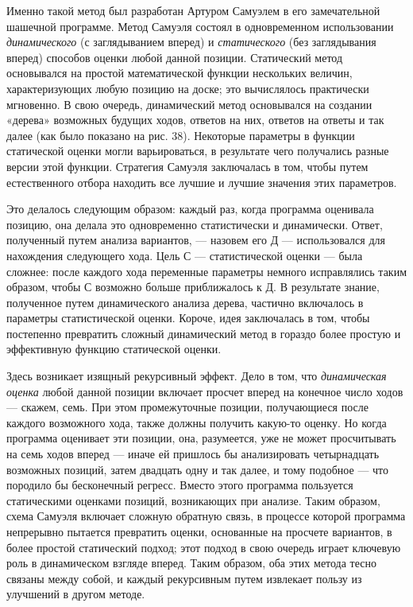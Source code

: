 Именно такой метод был разработан Артуром Самуэлем в его замечательной шашечной программе. Метод Самуэля состоял в одновременном использовании \emph{динамического} (с заглядыванием вперед) и \emph{статического} (без заглядывания вперед) способов оценки любой данной позиции. Статический метод основывался на простой математической функции нескольких величин, характеризующих любую позицию на доске; это вычислялось практически мгновенно. В свою очередь, динамический метод основывался на создании «дерева» возможных будущих ходов, ответов на них, ответов на ответы и так далее (как было показано на рис. 38). Некоторые параметры в функции статической оценки могли варьироваться, в результате чего получались разные версии этой функции. Стратегия Самуэля заключалась в том, чтобы путем естественного отбора находить все лучшие и лучшие значения этих параметров.

Это делалось следующим образом: каждый раз, когда программа оценивала позицию, она делала это одновременно статистически и динамически. Ответ, полученный путем анализа вариантов, --- назовем его Д --- использовался для нахождения следующего хода. Цель С --- статистической оценки --- была сложнее: после каждого хода переменные параметры немного исправлялись таким образом, чтобы С возможно больше приближалось к Д. В результате знание, полученное путем динамического анализа дерева, частично включалось в параметры статистической оценки. Короче, идея заключалась в том, чтобы постепенно превратить сложный динамический метод в гораздо более простую и эффективную функцию статической оценки.

Здесь возникает изящный рекурсивный эффект. Дело в том, что \emph{динамическая оценка} любой данной позиции включает просчет вперед на конечное число ходов --- скажем, семь. При этом промежуточные позиции, получающиеся после каждого возможного хода, также должны получить какую-то оценку. Но когда программа оценивает эти позиции, она, разумеется, уже не может просчитывать на семь ходов вперед --- иначе ей пришлось бы анализировать четырнадцать возможных позиций, затем двадцать одну и так далее, и тому подобное --- что породило бы бесконечный регресс. Вместо этого программа пользуется статическими оценками позиций, возникающих при анализе. Таким образом, схема Самуэля включает сложную обратную связь, в процессе которой программа непрерывно пытается превратить оценки, основанные на просчете вариантов, в более простой статический подход; этот подход в свою очередь играет ключевую роль в динамическом взгляде вперед. Таким образом, оба этих метода тесно связаны между собой, и каждый рекурсивным путем извлекает пользу из улучшений в другом методе.

